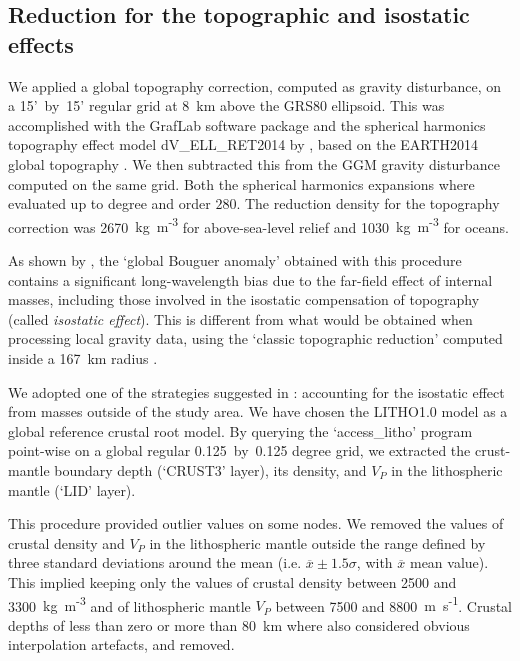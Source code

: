 \subsection{Reduction for the topographic and isostatic effects}
\label{ss:Appl:GravTopoIso}
We applied a global topography correction, computed as gravity disturbance, on a 15'~by~15' regular grid at 8~km above the GRS80 ellipsoid.
This was accomplished with the GrafLab software package \parencites{bucha2013GrafLab} and the spherical harmonics topography effect model {dV\_ELL\_RET2014} by \textcite{Rexer2016}, based on the {EARTH2014} global topography \parencite{Hirt2015}.
We then subtracted this from the GGM gravity disturbance computed on the same grid.
Both the spherical harmonics expansions where evaluated up to degree and order $280$.
The reduction density for the topography correction was 2670~{kg~m\textsuperscript{-3}} for above-sea-level relief and 1030~{kg~m\textsuperscript{-3}} for oceans.

As shown by \textcite{Szwillus2016}, the `global Bouguer anomaly' obtained with this procedure contains a significant long-wavelength bias due to the far-field effect of internal masses, including those involved in the isostatic compensation of topography (called \textit{isostatic effect}).
This is different from what would be obtained when processing local gravity data, using the `classic topographic reduction' computed inside a 167~km radius \parencite{hayford1912}.

We adopted one of the strategies suggested in \textcite{Szwillus2016}: accounting for the isostatic effect from masses outside of the study area.
We have chosen the {LITHO1.0} model \parencite{Pasyanos2014} as a global reference crustal root model.
By querying the `{access\_litho}' program point-wise on a global regular {0.125}~by~{0.125} degree grid, we extracted the crust-mantle boundary depth (`CRUST3' layer), its density, and $V_P$ in the lithospheric mantle (`LID' layer).

This procedure provided outlier values on some nodes.
We removed the values of crustal density and $V_P$ in the lithospheric mantle outside the range defined by three standard deviations around the mean (i.e. $\overline{x} \pm 1.5 \sigma $, with $\overline{x}$ mean value).
This implied keeping only the values of crustal density between 2500 and 3300~{kg~m\textsuperscript{-3}} and of lithospheric mantle $V_P$ between 7500 and 8800~{m~s\textsuperscript{-1}}.
Crustal depths of less than zero or more than 80~km where also considered obvious interpolation artefacts, and removed.

